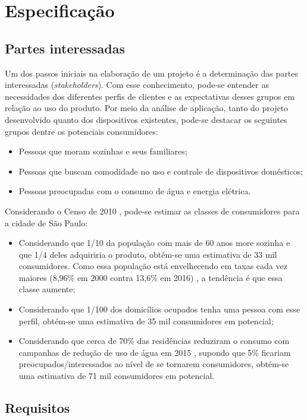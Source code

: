 \chapter{Especificação}

\section{Partes interessadas}
Um dos passos iniciais na elaboração de um projeto é a determinação das partes interessadas (\emph{stakeholders}). Com esse conhecimento, pode-se entender as necessidades dos diferentes perfis de clientes e as expectativas desses grupos em relação ao uso do produto. Por meio da análise de aplicação, tanto do projeto desenvolvido quanto dos dispositivos existentes, pode-se destacar os seguintes grupos dentre os potenciais consumidores:

\begin{itemize}
\item Pessoas que moram sozinhas e seus familiares;
\item Pessoas que buscam comodidade no uso e controle de dispositivos domésticos;
\item Pessoas preocupadas com o consumo de água e energia elétrica.
\end{itemize}

Considerando o Censo de 2010 \cite{ibge}, pode-se estimar as classes de consumidores para a cidade de São Paulo:

\begin{itemize}
\item Considerando que 1/10 da população com mais de 60 anos more sozinha e que 1/4 deles adquiriria o produto, obtém-se uma estimativa de 33 mil consumidores. Como essa população está envelhecendo em taxas cada vez maiores (8,96\% em 2000 contra 13,6\% em 2016) \cite{bibliotecaVirtual}, a tendência é que essa classe aumente;
\item Considerando que 1/100 dos domicílios ocupados tenha uma pessoa com esse perfil, obtém-se uma estimativa de 35 mil consumidores em potencial;
\item Considerando que cerca de 70\% das residências reduziram o consumo com campanhas de redução de uso de água em 2015 \cite{g1}, supondo que 5\% ficariam preocupados/interessados ao nível de se tornarem consumidores, obtém-se uma estimativa de 71 mil consumidores em potencial.
\end{itemize}

\section{Requisitos \label{sec:requisitos}}


